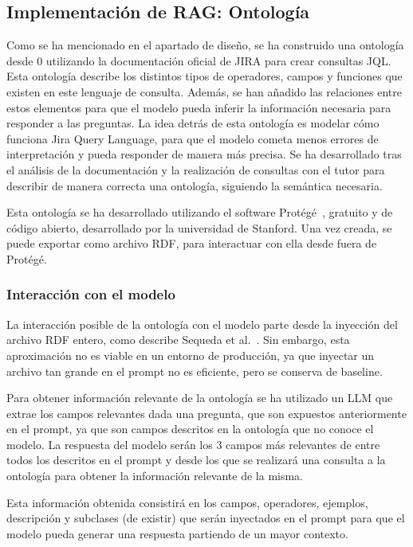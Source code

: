 \subsection{Implementación de RAG: Ontología}
Como se ha mencionado en el apartado de diseño, se ha construido una ontología desde 0 utilizando la documentación oficial de JIRA para crear consultas JQL. Esta ontología describe los distintos tipos de operadores, campos y funciones que existen en este lenguaje de consulta. Además, se han añadido las relaciones entre estos elementos para que el modelo pueda inferir la información necesaria para responder a las preguntas. La idea detrás de esta ontología es modelar cómo funciona Jira Query Language, para que el modelo cometa menos errores de interpretación y pueda responder de manera más precisa. Se ha desarrollado tras el análisis de la documentación y la realización de consultas con el tutor para describir de manera correcta una ontología, siguiendo la semántica necesaria.

Esta ontología se ha desarrollado utilizando el software Protégé~\cite{protege}, gratuito y de código abierto, desarrollado por la universidad de Stanford. Una vez creada, se puede exportar como archivo RDF, para interactuar con ella desde fuera de Protégé.

\subsubsection{Interacción con el modelo}
La interacción posible de la ontología con el modelo parte desde la inyección del archivo RDF entero, como describe Sequeda et al.~\cite{sequeda2023benchmark}. Sin embargo, esta aproximación no es viable en un entorno de producción, ya que inyectar un archivo tan grande en el prompt no es eficiente, pero se conserva de baseline. 

Para obtener información relevante de la ontología se ha utilizado un LLM que extrae los campos relevantes dada una pregunta, que son expuestos anteriormente en el prompt, ya que son campos descritos en la ontología que no conoce el modelo. La respuesta del modelo serán los 3 campos más relevantes de entre todos los descritos en el prompt y desde los que se realizará una consulta a la ontología para obtener la información relevante de la misma.

Esta información obtenida consistirá en los campos, operadores, ejemplos, descripción y subclases (de existir) que serán inyectados en el prompt para que el modelo pueda generar una respuesta partiendo de un mayor contexto.